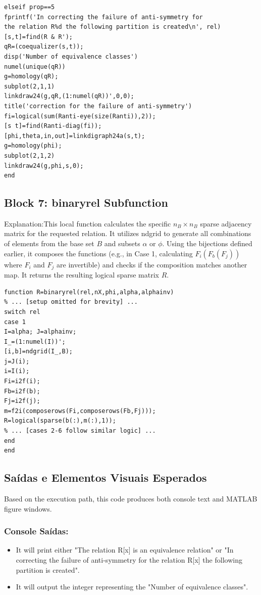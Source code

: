 \begin{lstlisting}
elseif prop==5
fprintf('In correcting the failure of anti-symmetry for 
the relation R%d the following partition is created\n', rel)
[s,t]=find(R & R');
qR=(coequalizer(s,t));
disp('Number of equivalence classes')
numel(unique(qR))   
g=homology(qR);
subplot(2,1,1)
linkdraw24(g,qR,(1:numel(qR))',0,0);
title('correction for the failure of anti-symmetry')
fi=logical(sum(Ranti-eye(size(Ranti)),2));
[s t]=find(Ranti-diag(fi));
[phi,theta,in,out]=linkdigraph24a(s,t);
g=homology(phi);
subplot(2,1,2)
linkdraw24(g,phi,s,0);
end
\end{lstlisting}

\subsection*{\hspace*{0.2cm} Block 7: binaryrel Subfunction}
Explanation:This local function calculates the specific $n_B \times n_B$ sparse adjacency matrix for the requested relation. It utilizes ndgrid to generate all combinations of elements from the base set $B$ and subsets $\alpha$ or $\phi$. Using the bijections defined earlier, it composes the functions (e.g., in Case 1, calculating $F_i(F_b(F_j))$ where $F_i$ and $F_j$ are invertible) and checks if the composition matches another map. It returns the resulting logical sparse matrix $R$.

\begin{lstlisting}
function R=binaryrel(rel,nX,phi,alpha,alphainv)
% ... [setup omitted for brevity] ...
switch rel
case 1 
I=alpha; J=alphainv; 
I_=(1:numel(I))'; 
[i,b]=ndgrid(I_,B); 
j=J(i);   
i=I(i);   
Fi=i2f(i); 
Fb=i2f(b);
Fj=i2f(j);  
m=f2i(composerows(Fi,composerows(Fb,Fj))); 
R=logical(sparse(b(:),m(:),1));
% ... [cases 2-6 follow similar logic] ...
end 
end
\end{lstlisting}


\subsection*{\hspace*{0.2cm} Saídas e Elementos Visuais Esperados}
Based on the execution path, this code produces both console text and MATLAB figure windows.

\subsubsection*{Console Saídas:}
         \begin{itemize}
            \item It will print either "The relation R[x] is an equivalence relation" or "In correcting the failure of anti-symmetry for the relation R[x] the following partition is created".
        \end{itemize}
        \begin{itemize}
         \item It will output the integer representing the "Number of equivalence classes".
        \end{itemize}

